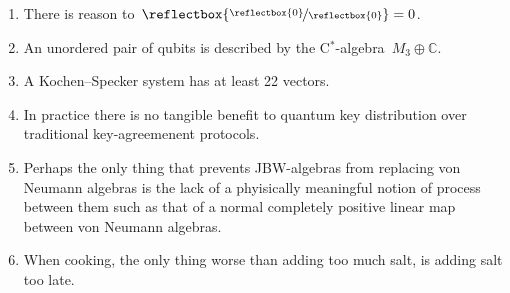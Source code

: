 \documentclass{article}
\newcommand\rfrac[2]{\reflectbox{\nicefrac{\reflectbox{\ensuremath{#1}}}{\reflectbox{\ensuremath{#2}}}}}
\begin{document}
\begin{enumerate}
\item
    There is reason to~$\rfrac{0}{0}=0$.
\item
    An unordered pair of qubits is described
        by the C$^*$-algebra~$M_3 \oplus \mathbb{C}$.
\item
    A Kochen--Specker system has at least 22 vectors.
\item
    In practice there is no tangible benefit
        to quantum key distribution over traditional key-agreemenent protocols.
\item
    Perhaps the only thing that prevents JBW-algebras from replacing
            von Neumann algebras is
            the lack of a phyisically meaningful notion
            of process between them
            such as that of a normal completely positive linear map
            between von Neumann algebras.
\item
    When cooking,
        the only thing worse than adding too much salt,
        is adding salt too late.
\end{enumerate}
\end{document}
